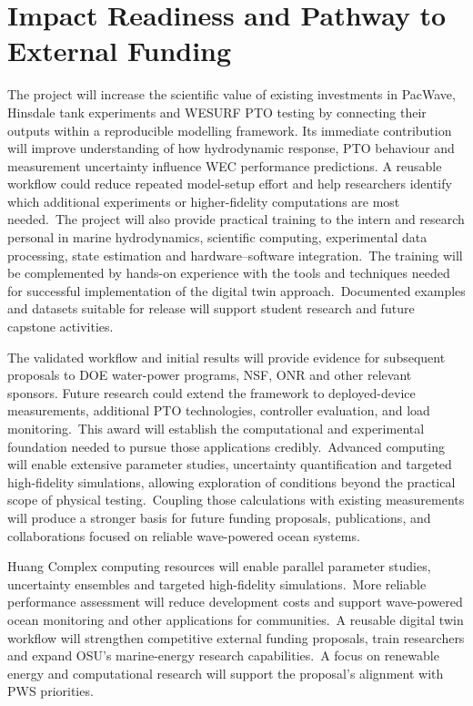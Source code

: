 \documentclass[11pt]{article}
\begin{document}
\section{Impact Readiness and Pathway to External Funding}
The project will increase the scientific value of existing investments in PacWave, Hinsdale tank experiments and WESURF PTO testing by connecting their outputs within a reproducible modelling framework. Its immediate contribution will improve understanding of how hydrodynamic response, PTO behaviour and measurement uncertainty influence WEC performance predictions. A reusable workflow could reduce repeated model-setup effort and help researchers identify which additional experiments or higher-fidelity computations are most needed.~The project will also provide practical training to the intern and research personal in marine hydrodynamics, scientific computing, experimental data processing, state estimation and hardware–software integration.~The training will be complemented by hands-on experience with the tools and techniques needed for successful implementation of the digital twin approach.~Documented examples and datasets suitable for release will support student research and future capstone activities.
\par
The validated workflow and initial results will provide evidence for subsequent proposals to DOE water-power programs, NSF, ONR and other relevant sponsors. Future research could extend the framework to deployed-device measurements, additional PTO technologies, controller evaluation, and load monitoring.~This award will establish the computational and experimental foundation needed to pursue those applications credibly.~Advanced computing will enable extensive parameter studies, uncertainty quantification and targeted high-fidelity simulations, allowing exploration of conditions beyond the practical scope of physical testing.~Coupling those calculations with existing measurements will produce a stronger basis for future funding proposals, publications, and collaborations focused on reliable wave-powered ocean systems.
\par
Huang Complex computing resources will enable parallel parameter studies, uncertainty ensembles and targeted high-fidelity simulations.~More reliable performance assessment will reduce development costs and support wave-powered ocean monitoring and other applications for communities.~A reusable digital twin workflow will strengthen competitive external funding proposals, train researchers and expand OSU’s marine-energy research capabilities.~A focus on renewable energy and computational research will support the proposal’s alignment with PWS priorities.


\end{document}
